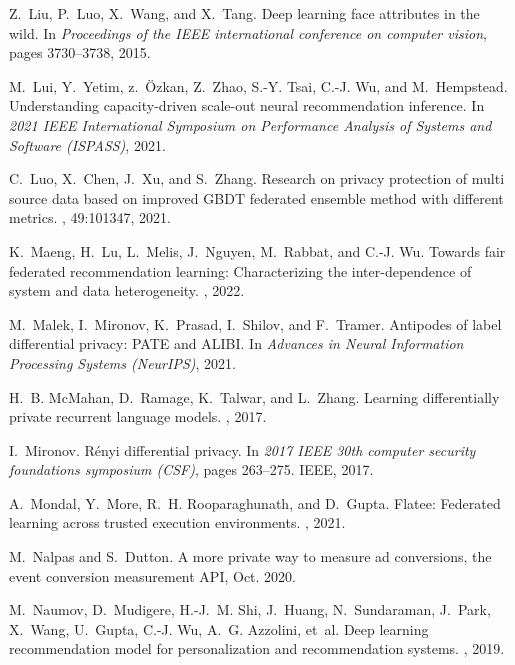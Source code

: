 \documentclass{article}
\begin{document}
\begin{thebibliography}{10}
Z.~Liu, P.~Luo, X.~Wang, and X.~Tang.
\newblock Deep learning face attributes in the wild.
\newblock In {\em Proceedings of the IEEE international conference on computer
  vision}, pages 3730--3738, 2015.

M.~Lui, Y.~Yetim, z.~Özkan, Z.~Zhao, S.-Y. Tsai, C.-J. Wu, and M.~Hempstead.
\newblock Understanding capacity-driven scale-out neural recommendation
  inference.
\newblock In {\em 2021 IEEE International Symposium on Performance Analysis of
  Systems and Software (ISPASS)}, 2021.

C.~Luo, X.~Chen, J.~Xu, and S.~Zhang.
\newblock Research on privacy protection of multi source data based on improved
  {GBDT} federated ensemble method with different metrics.
, 49:101347, 2021.

K.~Maeng, H.~Lu, L.~Melis, J.~Nguyen, M.~Rabbat, and C.-J. Wu.
\newblock Towards fair federated recommendation learning: Characterizing the
  inter-dependence of system and data heterogeneity.
, 2022.

M.~Malek, I.~Mironov, K.~Prasad, I.~Shilov, and F.~Tramer.
\newblock Antipodes of label differential privacy: {PATE} and {ALIBI}.
\newblock In {\em Advances in Neural Information Processing Systems (NeurIPS)},
  2021.

H.~B. McMahan, D.~Ramage, K.~Talwar, and L.~Zhang.
\newblock Learning differentially private recurrent language models.
, 2017.

I.~Mironov.
\newblock R{\'e}nyi differential privacy.
\newblock In {\em 2017 IEEE 30th computer security foundations symposium
  (CSF)}, pages 263--275. IEEE, 2017.

A.~Mondal, Y.~More, R.~H. Rooparaghunath, and D.~Gupta.
\newblock Flatee: Federated learning across trusted execution environments.
, 2021.

M.~Nalpas and S.~Dutton.
\newblock A more private way to measure ad conversions, the event conversion
  measurement {API}, Oct. 2020.

M.~Naumov, D.~Mudigere, H.-J.~M. Shi, J.~Huang, N.~Sundaraman, J.~Park,
  X.~Wang, U.~Gupta, C.-J. Wu, A.~G. Azzolini, et~al.
\newblock Deep learning recommendation model for personalization and
  recommendation systems.
, 2019.


\end{thebibliography}
\end{document}
